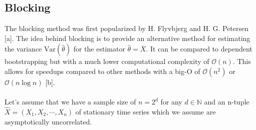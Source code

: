 \subsection*{Blocking}

The blocking method was first popularized by H. Flyvbjerg and H. G. Petersen [a]. The idea behind blocking is to provide an alternative method for estimating the variance $\text{Var}(\hat{\theta})$ for the estimator $\hat{\theta} = \overline{X}$. It can be compared to dependent bootstrapping but with a much lower computational complexity of $\mathcal{O}(n)$. This allows for speedups compared to other methods with a big-O of $\mathcal{O}(n^2)$ or $\mathcal{O}(n \log n)$ [b]. \\\\
Let's assume that we have a sample size of $n = 2^d$ for any $d \in \mathbb{N}$ and an n-tuple $\hat{X} = (X_1, X_2, \cdots, X_n)$ of stationary time series which we assume are asymptotically uncorrelated. 


